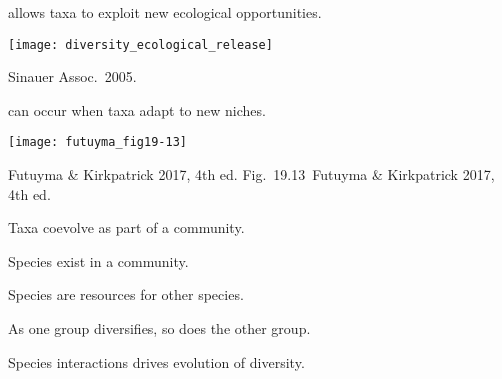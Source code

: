 \documentclass[t]{beamer}
\newcommand{\futuyma}[1]{%
	\ifthenelse{\isempty{#1}}%
	{Futuyma \& Kirkpatrick 2017, 4th ed.}%
	{Fig.~#1~Futuyma \& Kirkpatrick 2017, 4th ed.}%
}
\newcommand{\backskip}{\vspace{-0.5\baselineskip}}
\begin{document}

\begin{frame}{ allows taxa to exploit new ecological opportunities.}


\centering

\texttt{[image: diversity\_ecological\_release]}
	
\tinyfill \textcopyright Sinauer Assoc.~2005.

\end{frame}

%

\begin{frame}{ can occur when taxa adapt to new niches.}


\centering

\texttt{[image: futuyma\_fig19-13]}
	
\tinyfill \futuyma{19.13}

\end{frame}


\begin{frame}{Taxa coevolve as part of a community.}

\hangpara Species exist in a community.

\hangpara Species are resources for other species.

\hangpara As one group diversifies, so does the other group.

\hangpara Species interactions drives evolution of diversity.

\end{frame}

%


\end{document}
